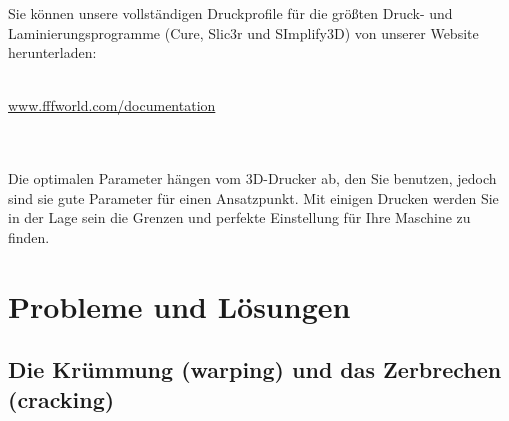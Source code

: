 \documentclass[11pt,a4paper]{article}
\begin{document}
Sie können unsere vollständigen Druckprofile für die größten Druck- und Laminierungsprogramme (Cure, Slic3r und SImplify3D) von unserer Website herunterladen:
\\\\
\centerline{ {\huge \url{www.fffworld.com/documentation} } }
\\\\
Die optimalen Parameter hängen vom 3D-Drucker ab, den Sie benutzen, jedoch sind sie gute Parameter für einen Ansatzpunkt. Mit einigen Drucken werden Sie in der Lage sein die Grenzen und perfekte Einstellung für Ihre Maschine zu finden.
\section{Probleme und Lösungen}
	\subsection{Die Krümmung (warping) und das Zerbrechen (cracking)}
\end{document}
